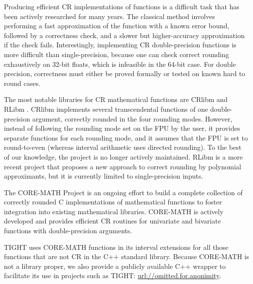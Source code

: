 Producing efficient CR implementations of functions is a difficult task that has been actively researched for many years.
The classical method involves performing a fast approximation of the function with a known error bound, followed by a correctness check, and a slower but higher-accuracy approximation if the check fails.
Interestingly, implementing CR double-precision functions is more difficult than single-precision, because one can check correct rounding exhaustively on 32-bit floats, which is infeasible in the 64-bit case.
For double precision, correctness must either be proved formally or tested on known hard to round cases.

The most notable libraries for CR mathematical functions are CRlibm \cite{crlibm} and RLibm \cite{rlibm}.
CRlibm implements several transcendental functions of one double-precision argument, correctly rounded in the four rounding modes. However, instead of following the rounding mode set on the FPU by the user, it provides separate functions for each rounding mode, and it assumes that the FPU is set to round-to-even (whereas interval arithmetic uses directed rounding).
To the best of our knowledge, the project is no longer actively maintained.
RLibm is a more recent project that proposes a new approach to correct rounding by polynomial approximants, but it is currently limited to single-precision inputs.

The CORE-MATH Project \cite{coremath} is an ongoing effort to build a complete collection of correctly rounded C implementations of mathematical functions to foster integration into existing mathematical libraries. CORE-MATH is actively developed and provides efficient CR routines for univariate and bivariate functions with double-precision arguments.

TIGHT uses CORE-MATH functions in its interval extensions for all those functions that are not CR in the C++ standard library.
Because CORE-MATH is not a library proper, we also provide a publicly available C++ wrapper to facilitate its use in projects such as TIGHT: \url{url://omitted.for.anonimity}.
